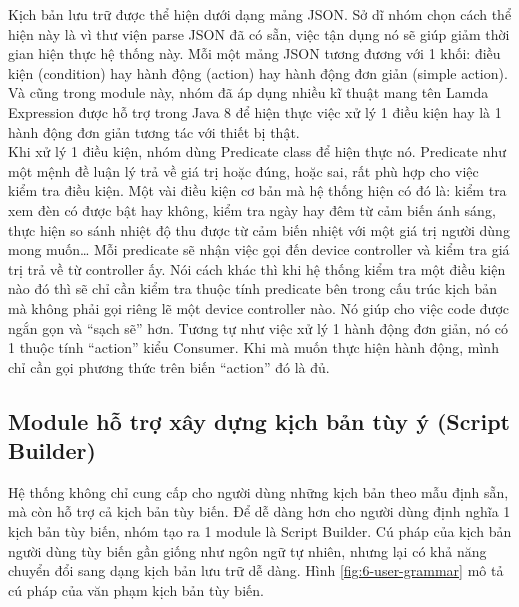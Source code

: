 \documentclass[12pt,a4paper,oneside]{extbook}
\begin{document}
\noindent
Kịch bản lưu trữ được thể hiện dưới dạng mảng JSON. Sở dĩ nhóm chọn cách thể hiện này là vì thư viện parse JSON đã có sẵn, việc tận dụng nó sẽ giúp giảm thời gian hiện thực hệ thống này. Mỗi một mảng JSON tương đương với 1 khối: điều kiện (condition) hay hành động (action) hay hành động đơn giản (simple action). Và cũng trong module này, nhóm đã áp dụng nhiều kĩ thuật mang tên Lamda Expression được hỗ trợ trong Java 8 để hiện thực việc xử lý 1 điều kiện hay là 1 hành động đơn giản tương tác với thiết bị thật.\\

\noindent
Khi xử lý 1 điều kiện, nhóm dùng Predicate class để hiện thực nó. Predicate như một mệnh đề luận lý trả về giá trị hoặc đúng, hoặc sai, rất phù hợp cho việc kiểm tra điều kiện. Một vài điều kiện cơ bản mà hệ thống hiện có đó là: kiểm tra xem đèn có được bật hay không, kiểm tra ngày hay đêm từ cảm biến ánh sáng, thực hiện so sánh nhiệt độ thu được từ cảm biến nhiệt với một giá trị người dùng mong muốn… Mỗi predicate sẽ nhận việc gọi đến device controller và kiểm tra giá trị trả về từ controller ấy. Nói cách khác thì khi hệ thống kiểm tra một điều kiện nào đó thì sẽ chỉ cần kiểm tra thuộc tính predicate bên trong cấu trúc kịch bản mà không phải gọi riêng lẽ một device controller nào. Nó giúp cho việc code được ngắn gọn và “sạch sẽ” hơn. Tương tự như việc xử lý 1 hành động đơn giản, nó có 1 thuộc tính “action” kiểu Consumer. Khi mà muốn thực hiện hành động, mình chỉ cần gọi phương thức trên biến “action” đó là đủ.

\subsection{Module hỗ trợ xây dựng kịch bản tùy ý (Script Builder)}\label{script-builder}

Hệ thống không chỉ cung cấp cho người dùng những kịch bản theo mẫu định sẵn, mà còn hỗ trợ cả kịch bản tùy biến. Để dễ dàng hơn cho người dùng định nghĩa 1 kịch bản tùy biến, nhóm tạo ra 1 module là Script Builder. Cú pháp của kịch bản người dùng tùy biến gần giống như ngôn ngữ tự nhiên, nhưng lại có khả năng chuyển đổi sang dạng kịch bản lưu trữ dễ dàng. Hình \ref{fig:6-user-grammar} mô tả cú pháp của văn phạm kịch bản tùy biến.\\
\end{document}
